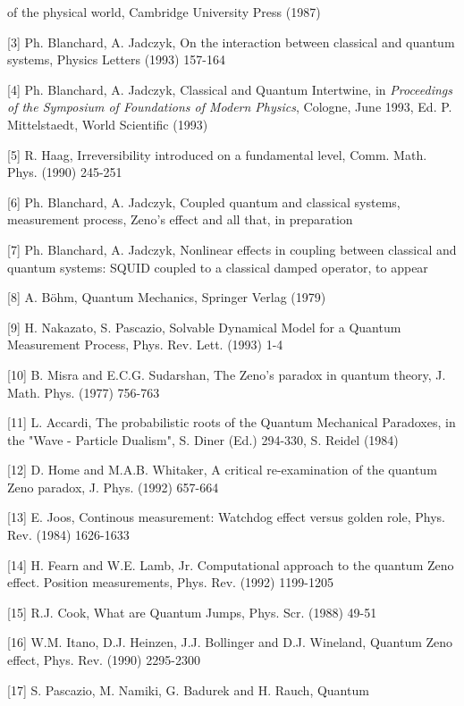 of the physical world, Cambridge University Press (1987)
\item{[3]} Ph. Blanchard, A. Jadczyk, On the interaction between
classical and quantum systems, Physics Letters  (1993)
157-164
\item{[4]} Ph. Blanchard, A. Jadczyk, Classical and Quantum Intertwine,
in {\it Proceedings of the Symposium of Foundations of Modern Physics},
Cologne, June 1993, Ed. P. Mittelstaedt, World Scientific (1993)
\item{[5]} R. Haag, Irreversibility introduced on a fundamental level,
Comm. Math. Phys.  (1990) 245-251
\item{[6]} Ph. Blanchard, A. Jadczyk, Coupled quantum and classical
systems, measurement process, Zeno's effect and all that, in
preparation
\item{[7]} Ph. Blanchard, A. Jadczyk, Nonlinear effects in coupling
between classical and quantum systems: SQUID coupled to a classical
damped operator, to appear
\item{[8]} A. B\"ohm, Quantum Mechanics, Springer Verlag (1979)
\item{[9]} H. Nakazato, S. Pascazio, Solvable Dynamical Model for a
Quantum Measurement Process, Phys. Rev. Lett.  (1993)
1-4
\item{[10]} B. Misra and E.C.G. Sudarshan, The Zeno's paradox in
quantum theory, J. Math. Phys.  (1977) 756-763
\item{[11]} L. Accardi, The probabilistic roots of the
Quantum Mechanical Paradoxes, in the "Wave - Particle Dualism",
S. Diner (Ed.) 294-330, S. Reidel (1984)
\item{[12]} D. Home and M.A.B. Whitaker, A critical re-examination of
the quantum Zeno paradox, J. Phys.  (1992) 657-664
\item{[13]} E. Joos, Continous measurement: Watchdog effect versus
golden role, Phys. Rev.  (1984) 1626-1633
\item{[14]} H. Fearn and W.E. Lamb, Jr. Computational approach to the
quantum Zeno effect. Position measurements, Phys. Rev.
 (1992) 1199-1205
\item{[15]} R.J. Cook, What are Quantum Jumps, Phys. Scr.  (1988) 49-51
\item{[16]} W.M. Itano, D.J. Heinzen, J.J. Bollinger and
D.J. Wineland, Quantum Zeno effect, Phys. Rev.  (1990)
2295-2300
\item{[17]} S. Pascazio, M. Namiki, G. Badurek and H. Rauch, Quantum
